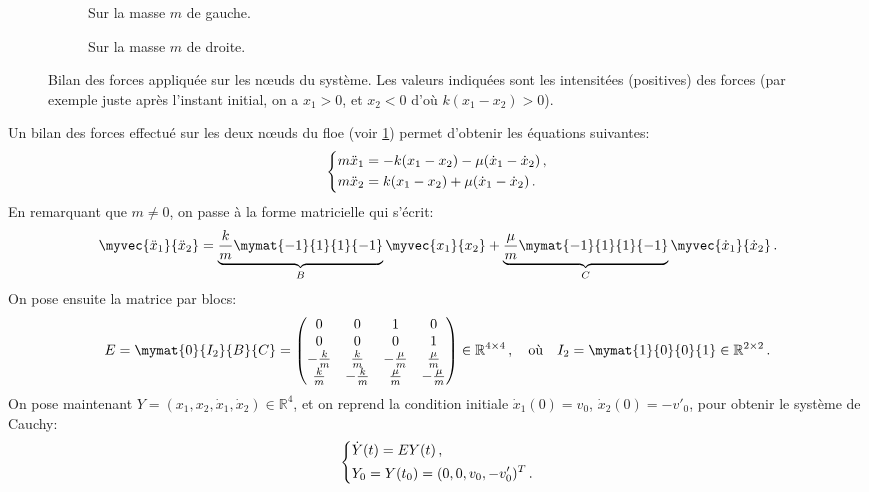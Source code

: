 \begin{figure}[!h]
    \begin{subfigure}[b]{0.33\textwidth}
        \centering
        \caption{Sur la masse $m$ de gauche.}
    \end{subfigure}
    \begin{subfigure}[b]{0.3\textwidth}
        \centering
        \caption{Sur la masse $m$ de droite.}
    \end{subfigure}
       \caption{Bilan des forces appliquée sur les n\oe{}uds du système. Les valeurs indiquées sont les intensitées (positives) des forces (par exemple juste après l'instant initial, on a $x_1 > 0$, et $x_2 < 0$ d'où $k(x_1-x_2) > 0$).}
       \label{fig:bilan0}
\end{figure}


\noindent Un bilan des forces effectué sur les deux n\oe{}uds du floe (voir \cref{fig:bilan0}) permet d'obtenir les équations suivantes:
\begin{align}
    \begin{dcases}
    m\ddot x_1 = - k(x_1 - x_2) - \mu(\dot x_1 - \dot x_2) \,,\\
        m \ddot x_2 =  k(x_1 - x_2) + \mu(\dot x_1 - \dot x_2) \,. 
    \end{dcases}
\end{align}
En remarquant que $m\neq 0$, on passe à la forme matricielle qui s'écrit:
\begin{align}
    \myvec{\ddot{x}_1}{\ddot{x}_2} = 
      \underbrace{ \frac{k}{m} \mymat{-1}{1}{1}{-1}}_{B} \myvec{x_1}{x_2}
    + \underbrace{\frac{\mu}{m} \mymat{-1}{1}{1}{-1}}_{C} \myvec{\dot{x}_1}{\dot{x}_2} \,.
\end{align}
On pose ensuite la matrice par blocs:
\[ E = \mymat{0}{I_2}{B}{C}  =  \begin{pmatrix}
    0 & 0 & 1 & 0 \\ 0 & 0& 0& 1 \\ -\frac{k}{m} & \frac{k}{m} & -\frac{\mu}{m} & \frac{\mu}{m} \\ \frac{k}{m} & -\frac{k}{m} & \frac{\mu}{m} & -\frac{\mu}{m}
\end{pmatrix}   \in \mathbb{R}^{4\times 4} \,, \quad \text{où} \quad I_2 = \mymat{1}{0}{0}{1} \in \mathbb{R}^{2\times 2} \,. \]
On pose maintenant $Y = (x_1, x_2, \dot{x}_1, \dot{x}_2) \in \mathbb{R}^4$, et on reprend la condition initiale $\dot x_1(0) = v_0$, $\dot x_2(0) = -v'_0$, pour obtenir le système de Cauchy:
\begin{align} \label{eq:dep1d}
    \begin{dcases}
        \dot{Y}(t)= E Y(t) \,, \\
        Y_0 = Y(t_0) = (0,0,v_0,-v'_0)^T \,.
    \end{dcases}
\end{align}

